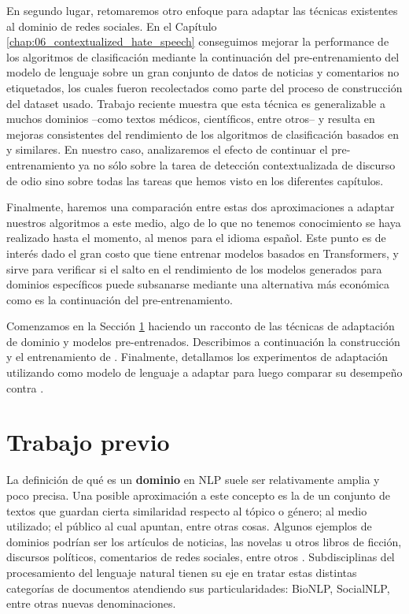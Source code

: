 En segundo lugar, retomaremos otro enfoque para adaptar las técnicas existentes al dominio de redes sociales. En el Capítulo \ref{chap:06_contextualized_hate_speech} conseguimos mejorar la performance de los algoritmos de clasificación mediante la continuación del pre-entrenamiento del modelo de lenguaje sobre un gran conjunto de datos de noticias y comentarios no etiquetados, los cuales fueron recolectados como parte del proceso de construcción del dataset usado. Trabajo reciente muestra que esta técnica es generalizable a muchos dominios --como textos médicos, científicos, entre otros-- y resulta en mejoras consistentes del rendimiento de los algoritmos de clasificación basados en \bert{} y similares. En nuestro caso, analizaremos el efecto de continuar el pre-entrenamiento ya no sólo sobre la tarea de detección contextualizada de discurso de odio sino sobre todas las tareas que hemos visto en los diferentes capítulos.

Finalmente, haremos una comparación entre estas dos aproximaciones a adaptar nuestros algoritmos a este medio, algo de lo que no tenemos conocimiento se haya realizado hasta el momento, al menos para el idioma español. Este punto es de interés dado el gran costo que tiene entrenar modelos basados en Transformers, y sirve para verificar si el salto en el rendimiento de los modelos generados para dominios específicos puede subsanarse mediante una alternativa más económica como es la continuación del pre-entrenamiento.

Comenzamos en la Sección \ref{sec:domain_adaptation_previous_work} haciendo un racconto de las técnicas de adaptación de dominio y modelos pre-entrenados. Describimos a continuación la  construcción y el entrenamiento de \robertuito{} \cite{perez2021robertuito}. Finalmente, detallamos los experimentos de adaptación utilizando \beto{} como modelo de lenguaje a adaptar para luego comparar su desempeño contra \robertuito{}.

\section{Trabajo previo}
\label{sec:domain_adaptation_previous_work}

La definición de qué es un \textbf{dominio} en NLP suele ser relativamente amplia y poco precisa. Una posible aproximación a este concepto es la de un conjunto de textos que guardan cierta similaridad respecto al tópico o género; al medio utilizado; el público al cual apuntan, entre otras cosas. Algunos ejemplos de dominios podrían ser los artículos de noticias, las novelas u otros libros de ficción, discursos políticos, comentarios de redes sociales, entre otros \cite{gururangan-etal-2020-dont}. Subdisciplinas del procesamiento del lenguaje natural tienen su eje en tratar estas distintas categorías de documentos atendiendo sus particularidades: BioNLP, SocialNLP, entre otras nuevas denominaciones.


